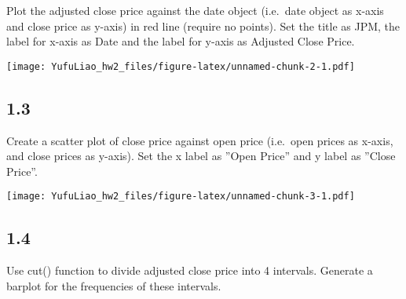 \documentclass[
]{article}
\newenvironment{Shaded}{\begin{snugshade}}{\end{snugshade}}
\newcommand{\AttributeTok}[1]{\textcolor[rgb]{0.77,0.63,0.00}{#1}}
\newcommand{\FunctionTok}[1]{\textcolor[rgb]{0.00,0.00,0.00}{#1}}
\newcommand{\NormalTok}[1]{#1}
\newcommand{\SpecialCharTok}[1]{\textcolor[rgb]{0.00,0.00,0.00}{#1}}
\newcommand{\StringTok}[1]{\textcolor[rgb]{0.31,0.60,0.02}{#1}}
\begin{document}
Plot the adjusted close price against the date object (i.e.~date object
as x-axis and close price as y-axis) in red line (require no points).
Set the title as JPM, the label for x-axis as Date and the label for
y-axis as Adjusted Close Price.

\begin{Shaded}
\end{Shaded}

\texttt{[image: YufuLiao\_hw2\_files/figure-latex/unnamed-chunk-2-1.pdf]}

\hypertarget{section-2}{%
\subsection{1.3}\label{section-2}}

Create a scatter plot of close price against open price (i.e.~open
prices as x-axis, and close prices as y-axis). Set the x label as ''Open
Price'' and y label as ''Close Price''.

\begin{Shaded}
\end{Shaded}

\texttt{[image: YufuLiao\_hw2\_files/figure-latex/unnamed-chunk-3-1.pdf]}

\hypertarget{section-3}{%
\subsection{1.4}\label{section-3}}

Use cut() function to divide adjusted close price into 4 intervals.
Generate a barplot for the frequencies of these intervals.
\end{document}
